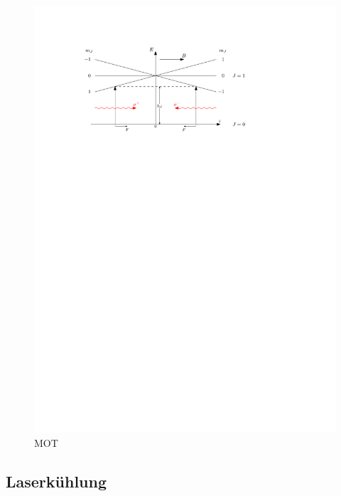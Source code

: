 \documentclass[11pt, a4paper]{article}
\numberwithin{equation}{section}
\begin{document}
\begin{figure}
	\centering
	\includegraphics{./figures/theory/mot.pdf}
	\caption{MOT}
\end{figure}


\subsection{Laserkühlung}
\end{document}
